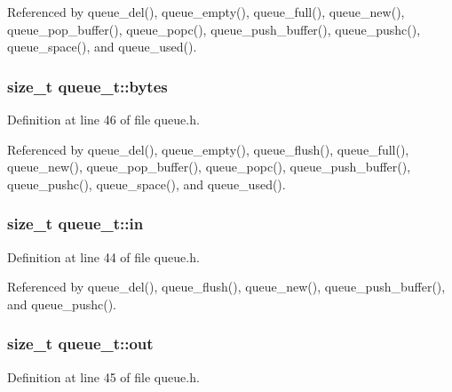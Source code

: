 Referenced by queue\+\_\+del(), queue\+\_\+empty(), queue\+\_\+full(), queue\+\_\+new(), queue\+\_\+pop\+\_\+buffer(), queue\+\_\+popc(), queue\+\_\+push\+\_\+buffer(), queue\+\_\+pushc(), queue\+\_\+space(), and queue\+\_\+used().

\subsubsection[{\texorpdfstring{bytes}{bytes}}]{\setlength{\rightskip}{0pt plus 5cm}size\+\_\+t queue\+\_\+t\+::bytes}\hypertarget{structqueue__t_a58398d4ee60bc90ffba2bc3488fe185b}{}\label{structqueue__t_a58398d4ee60bc90ffba2bc3488fe185b}


Definition at line 46 of file queue.\+h.



Referenced by queue\+\_\+del(), queue\+\_\+empty(), queue\+\_\+flush(), queue\+\_\+full(), queue\+\_\+new(), queue\+\_\+pop\+\_\+buffer(), queue\+\_\+popc(), queue\+\_\+push\+\_\+buffer(), queue\+\_\+pushc(), queue\+\_\+space(), and queue\+\_\+used().

\subsubsection[{\texorpdfstring{in}{in}}]{\setlength{\rightskip}{0pt plus 5cm}size\+\_\+t queue\+\_\+t\+::in}\hypertarget{structqueue__t_a7a6832e36c70a1db7fddc93fb6be9d63}{}\label{structqueue__t_a7a6832e36c70a1db7fddc93fb6be9d63}


Definition at line 44 of file queue.\+h.



Referenced by queue\+\_\+del(), queue\+\_\+flush(), queue\+\_\+new(), queue\+\_\+push\+\_\+buffer(), and queue\+\_\+pushc().

\subsubsection[{\texorpdfstring{out}{out}}]{\setlength{\rightskip}{0pt plus 5cm}size\+\_\+t queue\+\_\+t\+::out}\hypertarget{structqueue__t_a8f6e1c623d2ceed398a71a0aab93b0fa}{}\label{structqueue__t_a8f6e1c623d2ceed398a71a0aab93b0fa}


Definition at line 45 of file queue.\+h.



